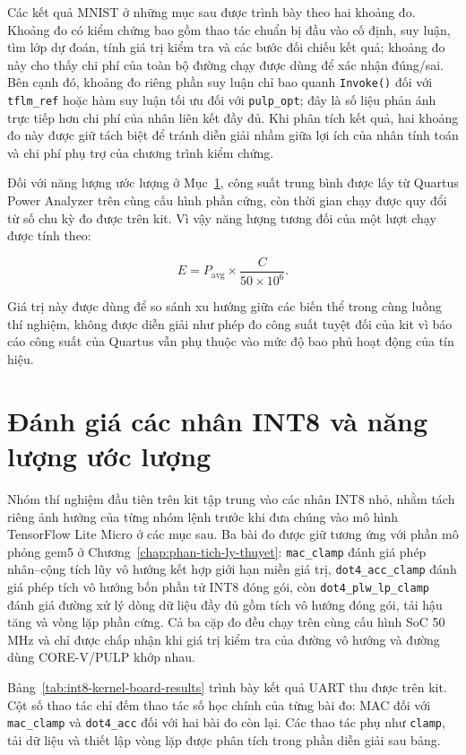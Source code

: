 \documentclass[../DoAn.tex]{subfiles}
\begin{document}
Các kết quả MNIST ở những mục sau được trình bày theo hai khoảng đo. Khoảng đo có kiểm chứng bao gồm thao tác chuẩn bị đầu vào cố định, suy luận, tìm lớp dự đoán, tính giá trị kiểm tra và các bước đối chiếu kết quả; khoảng đo này cho thấy chi phí của toàn bộ đường chạy được dùng để xác nhận đúng/sai. Bên cạnh đó, khoảng đo riêng phần suy luận chỉ bao quanh \texttt{Invoke()} đối với \texttt{tflm\_ref} hoặc hàm suy luận tối ưu đối với \texttt{pulp\_opt}; đây là số liệu phản ánh trực tiếp hơn chi phí của nhân liên kết đầy đủ. Khi phân tích kết quả, hai khoảng đo này được giữ tách biệt để tránh diễn giải nhầm giữa lợi ích của nhân tính toán và chi phí phụ trợ của chương trình kiểm chứng.

Đối với năng lượng ước lượng ở Mục~\ref{sec:danh-gia-nhan-int8}, công suất trung bình được lấy từ Quartus Power Analyzer trên cùng cấu hình phần cứng, còn thời gian chạy được quy đổi từ số chu kỳ đo được trên kit. Vì vậy năng lượng tương đối của một lượt chạy được tính theo:

\[
    E = P_{\mathrm{avg}} \times \frac{C}{50 \times 10^6}.
\]

Giá trị này được dùng để so sánh xu hướng giữa các biến thể trong cùng luồng thí nghiệm, không được diễn giải như phép đo công suất tuyệt đối của kit vì báo cáo công suất của Quartus vẫn phụ thuộc vào mức độ bao phủ hoạt động của tín hiệu.

\section{Đánh giá các nhân INT8 và năng lượng ước lượng}
\label{sec:danh-gia-nhan-int8}

Nhóm thí nghiệm đầu tiên trên kit tập trung vào các nhân INT8 nhỏ, nhằm tách riêng ảnh hưởng của từng nhóm lệnh trước khi đưa chúng vào mô hình TensorFlow Lite Micro ở các mục sau. Ba bài đo được giữ tương ứng với phần mô phỏng gem5 ở Chương~\ref{chap:phan-tich-ly-thuyet}: \texttt{mac\_clamp} đánh giá phép nhân--cộng tích lũy vô hướng kết hợp giới hạn miền giá trị, \texttt{dot4\_acc\_clamp} đánh giá phép tích vô hướng bốn phần tử INT8 đóng gói, còn \texttt{dot4\_plw\_lp\_clamp} đánh giá đường xử lý dòng dữ liệu đầy đủ gồm tích vô hướng đóng gói, tải hậu tăng và vòng lặp phần cứng. Cả ba cặp đo đều chạy trên cùng cấu hình SoC 50 MHz và chỉ được chấp nhận khi giá trị kiểm tra của đường vô hướng và đường dùng CORE-V/PULP khớp nhau.

Bảng~\ref{tab:int8-kernel-board-results} trình bày kết quả UART thu được trên kit. Cột số thao tác chỉ đếm thao tác số học chính của từng bài đo: MAC đối với \texttt{mac\_clamp} và \texttt{dot4\_acc} đối với hai bài đo còn lại. Các thao tác phụ như \texttt{clamp}, tải dữ liệu và thiết lập vòng lặp được phân tích trong phần diễn giải sau bảng.
\end{document}
